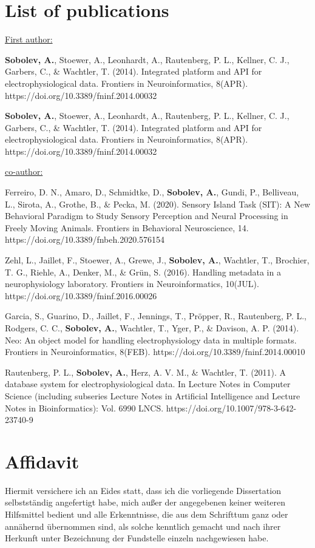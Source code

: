 \chapter{List of publications}

\underline{First author:}

\textbf{Sobolev, A.}, Stoewer, A., Leonhardt, A., Rautenberg, P. L., Kellner, C. J., Garbers, C., \& Wachtler, T. (2014). Integrated platform and API for electrophysiological data. Frontiers in Neuroinformatics, 8(APR).
https://doi.org/10.3389/fninf.2014.00032

\textbf{Sobolev, A.}, Stoewer, A., Leonhardt, A., Rautenberg, P. L., Kellner, C. J., Garbers, C., \& Wachtler, T. (2014). Integrated platform and API for electrophysiological data. Frontiers in Neuroinformatics, 8(APR).
https://doi.org/10.3389/fninf.2014.00032

\underline{co-author:}

Ferreiro, D. N., Amaro, D., Schmidtke, D., \textbf{Sobolev, A.}, Gundi, P., Belliveau, L., Sirota, A., Grothe, B., \& Pecka, M. (2020). Sensory Island Task (SIT): A New Behavioral Paradigm to Study Sensory Perception and Neural Processing in Freely Moving Animals. Frontiers in Behavioral Neuroscience, 14.
https://doi.org/10.3389/fnbeh.2020.576154

Zehl, L., Jaillet, F., Stoewer, A., Grewe, J., \textbf{Sobolev, A.}, Wachtler, T., Brochier, T. G., Riehle, A., Denker, M., \& Grün, S. (2016). Handling metadata in a neurophysiology laboratory. Frontiers in Neuroinformatics, 10(JUL).
https://doi.org/10.3389/fninf.2016.00026

Garcia, S., Guarino, D., Jaillet, F., Jennings, T., Pröpper, R., Rautenberg, P. L., Rodgers, C. C., \textbf{Sobolev, A.}, Wachtler, T., Yger, P., \& Davison, A. P. (2014). Neo: An object model for handling electrophysiology data in multiple formats. Frontiers in Neuroinformatics, 8(FEB).
https://doi.org/10.3389/fninf.2014.00010

Rautenberg, P. L., \textbf{Sobolev, A.}, Herz, A. V. M., \& Wachtler, T. (2011). A database system for electrophysiological data. In Lecture Notes in Computer Science (including subseries Lecture Notes in Artificial Intelligence and Lecture Notes in Bioinformatics): Vol. 6990 LNCS.
https://doi.org/10.1007/978-3-642-23740-9



\chapter{Affidavit}
Hiermit versichere ich an Eides statt, dass ich die vorliegende Dissertation selbstständig angefertigt habe, mich außer der angegebenen keiner weiteren Hilfsmittel bedient und alle Erkenntnisse, die aus dem Schrifttum ganz oder annähernd übernommen sind, als solche kenntlich gemacht und nach ihrer Herkunft unter Bezeichnung der Fundstelle einzeln nachgewiesen habe.

